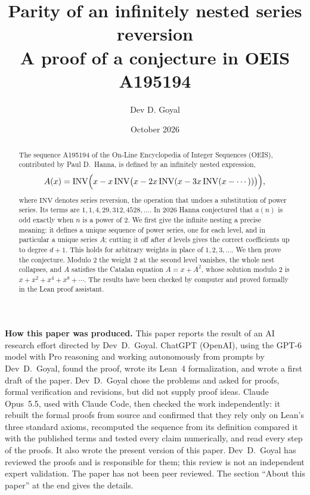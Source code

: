 \documentclass[11pt,a4paper]{article}
\title{Parity of an infinitely nested series reversion\\[6pt]\large A proof of a conjecture in OEIS A195194}
\author{Dev D. Goyal}
\date{October 2026}
\theoremstyle{definition}
\theoremstyle{remark}
\begin{document}
\maketitle
\begin{abstract}
The sequence A195194 of the On-Line Encyclopedia of Integer Sequences (OEIS), contributed by Paul D.~Hanna, is defined
by an infinitely nested expression,
\[
A(x)=\mathrm{INV}\Bigl(x-x\,\mathrm{INV}\bigl(x-2x\,\mathrm{INV}(x-3x\,\mathrm{INV}(x-\cdots))\bigr)\Bigr),
\]
where $\mathrm{INV}$ denotes series reversion, the operation that undoes a substitution of power series. Its terms are
$1,1,4,29,312,4528,\dots$. In 2026 Hanna conjectured that $a(n)$ is odd exactly when $n$ is a power of $2$. We first give
the infinite nesting a precise meaning: it defines a unique sequence of power series, one for each level, and in
particular a unique series $A$; cutting it off after $d$ levels gives the correct coefficients up to degree $d+1$. This holds for arbitrary weights in place of $1,2,3,\dots$. We then prove the
conjecture. Modulo $2$ the weight $2$ at the second level vanishes, the whole nest collapses, and $A$ satisfies the
Catalan equation $A=x+A^2$, whose solution modulo $2$ is $x+x^2+x^4+x^8+\cdots$. The results have been checked by
computer and proved formally in the Lean proof assistant.
\end{abstract}
\begin{center}\begin{minipage}{0.88\linewidth}\small
\textbf{How this paper was produced.} This paper reports the result of an AI research effort directed by
Dev~D.~Goyal. ChatGPT (OpenAI), using the GPT-6 model with Pro reasoning and working autonomously from prompts by
Dev~D.~Goyal, found the proof, wrote its Lean~4 formalization, and wrote a first draft of the paper.
Dev~D.~Goyal chose the problems and asked for proofs, formal verification and revisions, but did not supply proof
ideas. Claude Opus~5.5, used with Claude Code, then checked the work independently: it rebuilt the formal proofs from
source and confirmed that they rely only on Lean's three standard axioms, recomputed the sequence from its definition
compared it with the published terms and tested every claim numerically, and read every step of the proofs. It also wrote the present
version of this paper.
Dev~D.~Goyal has reviewed the proofs and is responsible for them; this review is not an independent expert validation.
The paper has not been peer reviewed.
The section ``About this paper'' at the end gives the details.
\end{minipage}\end{center}
\end{document}
